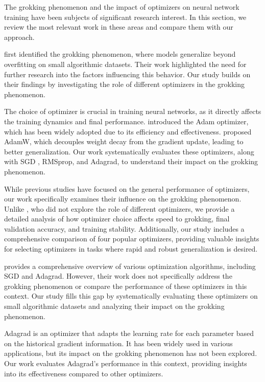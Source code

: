 \documentclass{article} %
\begin{document}
The grokking phenomenon and the impact of optimizers on neural network training have been subjects of significant research interest. In this section, we review the most relevant work in these areas and compare them with our approach.

\citet{power2022grokking} first identified the grokking phenomenon, where models generalize beyond overfitting on small algorithmic datasets. Their work highlighted the need for further research into the factors influencing this behavior. Our study builds on their findings by investigating the role of different optimizers in the grokking phenomenon.

The choice of optimizer is crucial in training neural networks, as it directly affects the training dynamics and final performance. \citet{kingma2014adam} introduced the Adam optimizer, which has been widely adopted due to its efficiency and effectiveness. \citet{loshchilov2017adamw} proposed AdamW, which decouples weight decay from the gradient update, leading to better generalization. Our work systematically evaluates these optimizers, along with SGD \cite{goodfellow2016deep}, RMSprop, and Adagrad, to understand their impact on the grokking phenomenon.

While previous studies have focused on the general performance of optimizers, our work specifically examines their influence on the grokking phenomenon. Unlike \citet{power2022grokking}, who did not explore the role of different optimizers, we provide a detailed analysis of how optimizer choice affects speed to grokking, final validation accuracy, and training stability. Additionally, our study includes a comprehensive comparison of four popular optimizers, providing valuable insights for selecting optimizers in tasks where rapid and robust generalization is desired.

\citet{goodfellow2016deep} provides a comprehensive overview of various optimization algorithms, including SGD and Adagrad. However, their work does not specifically address the grokking phenomenon or compare the performance of these optimizers in this context. Our study fills this gap by systematically evaluating these optimizers on small algorithmic datasets and analyzing their impact on the grokking phenomenon.

Adagrad is an optimizer that adapts the learning rate for each parameter based on the historical gradient information. It has been widely used in various applications, but its impact on the grokking phenomenon has not been explored. Our work evaluates Adagrad's performance in this context, providing insights into its effectiveness compared to other optimizers.
\end{document}
